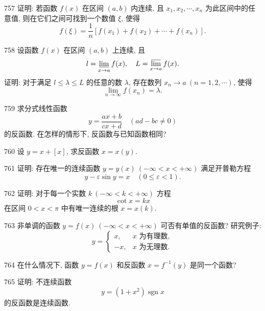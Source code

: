 \begin{prob}[M]{757}
证明: 若函数 $f(x)$ 在区间 $(a, b)$ 内连续, 且 $x_1, x_2, \cdots, x_n$ 为此区间中的任意值, 则在它们之间可找到一个数值 $\xi$, 使得
\[
f(\xi) = \frac{1}{n}[f(x_1) + f(x_2) + \cdots + f(x_n)].
\]
\end{prob}

\begin{prob}[M]{758}
设函数 $f(x)$ 在区间 $(a, b)$ 上连续, 且
\[
l = \varliminf_{x \to a} f(x), \quad L = \varlimsup_{x \to a} f(x).
\]
证明: 对于满足 $l \leqslant \lambda \leqslant L$ 的任意的数 $\lambda$, 存在数列 $x_n \to a \ (n = 1, 2, \cdots)$, 使得
\[
\lim_{n \to \infty} f(x_n) = \lambda.
\]
\end{prob}


\begin{prob}[M]{759}
求分式线性函数
\[
y = \frac{ax + b}{cx + d} \quad (ad - bc \neq 0)
\]
的反函数. 在怎样的情形下, 反函数与已知函数相同?
\end{prob}

\begin{prob}[S]{760}
设 $y = x + [x]$, 求反函数 $x = x(y)$.
\end{prob}

\begin{prob}[M]{761}
证明: 存在唯一的连续函数 $y = y(x) \ (-\infty < x < +\infty)$ 满足开普勒方程
\[
y - \varepsilon \sin y = x \quad (0 \leqslant \varepsilon < 1).
\]
\end{prob}

\begin{prob}[M]{762}
证明: 对于每一个实数 $k \ (-\infty < k < +\infty)$ 方程
\[
\cot x = kx
\]
在区间 $0 < x < \pi$ 中有唯一连续的根 $x = x(k)$.
\end{prob}

\begin{prob}[M]{763}
非单调的函数 $y = f(x) \ (-\infty < x < +\infty)$ 可否有单值的反函数? 研究例子:
\[
y = \begin{cases}
x, & x \text{ 为有理数}, \\
-x, & x \text{ 为无理数}.
\end{cases}
\]
\end{prob}

\begin{prob}[S]{764}
在什么情况下, 函数 $y = f(x)$ 和反函数 $x = f^{-1}(y)$ 是同一个函数?
\end{prob}

\begin{prob}[M]{765}
证明: 不连续函数
\[
y = (1 + x^2)\operatorname{sgn} x
\]
的反函数是连续函数.
\end{prob}


